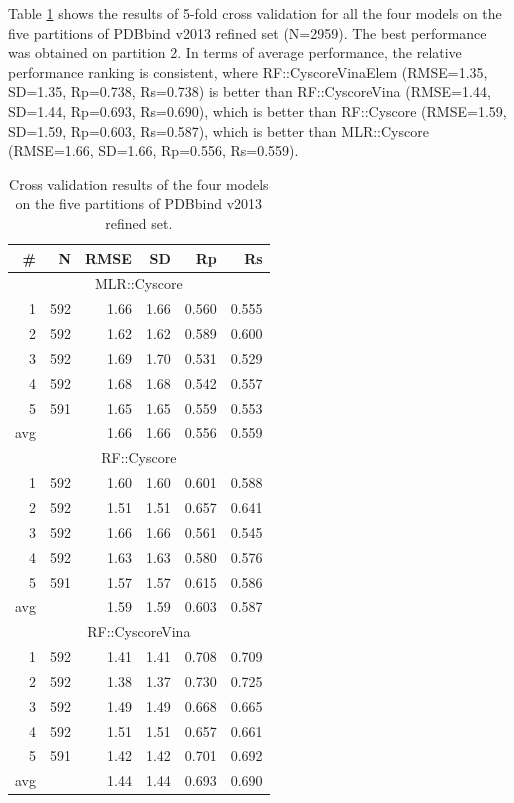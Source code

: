 Table \ref{rfcyscore:cv-stat} shows the results of 5-fold cross validation for all the four models on the five partitions of PDBbind v2013 refined set (N=2959). The best performance was obtained on partition 2. In terms of average performance, the relative performance ranking is consistent, where RF::CyscoreVinaElem (RMSE=1.35, SD=1.35, Rp=0.738, Rs=0.738) is better than RF::CyscoreVina (RMSE=1.44, SD=1.44, Rp=0.693, Rs=0.690), which is better than RF::Cyscore (RMSE=1.59, SD=1.59, Rp=0.603, Rs=0.587), which is better than MLR::Cyscore (RMSE=1.66, SD=1.66, Rp=0.556, Rs=0.559).

\begin{table}
\caption{Cross validation results of the four models on the five partitions of PDBbind v2013 refined set.}
\label{rfcyscore:cv-stat}
\begin{tabular}{rrrrrr}
\hline
\# & N & RMSE & SD & Rp & Rs\\
\hline
\multicolumn{6}{c}{MLR::Cyscore}\\
  1 & 592 & 1.66 & 1.66 & 0.560 & 0.555\\
  2 & 592 & 1.62 & 1.62 & 0.589 & 0.600\\
  3 & 592 & 1.69 & 1.70 & 0.531 & 0.529\\
  4 & 592 & 1.68 & 1.68 & 0.542 & 0.557\\
  5 & 591 & 1.65 & 1.65 & 0.559 & 0.553\\
avg &     & 1.66 & 1.66 & 0.556 & 0.559\\
\hline
\multicolumn{6}{c}{RF::Cyscore}\\
  1 & 592 & 1.60 & 1.60 & 0.601 & 0.588\\
  2 & 592 & 1.51 & 1.51 & 0.657 & 0.641\\
  3 & 592 & 1.66 & 1.66 & 0.561 & 0.545\\
  4 & 592 & 1.63 & 1.63 & 0.580 & 0.576\\
  5 & 591 & 1.57 & 1.57 & 0.615 & 0.586\\
avg &     & 1.59 & 1.59 & 0.603 & 0.587\\
\hline
\multicolumn{6}{c}{RF::CyscoreVina}\\
  1 & 592 & 1.41 & 1.41 & 0.708 & 0.709\\
  2 & 592 & 1.38 & 1.37 & 0.730 & 0.725\\
  3 & 592 & 1.49 & 1.49 & 0.668 & 0.665\\
  4 & 592 & 1.51 & 1.51 & 0.657 & 0.661\\
  5 & 591 & 1.42 & 1.42 & 0.701 & 0.692\\
avg &     & 1.44 & 1.44 & 0.693 & 0.690\\

\end{tabular}
\end{table}
